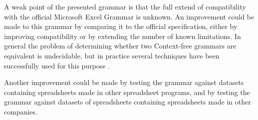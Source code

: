 \documentclass[conference]{IEEEtran}
\begin{document}
A weak point of the presented grammar is that the full extend of compatibility with the official Microsoft Excel Grammar is unknown.
An improvement could be made to this grammar by comparing it to the official specification, either by improving compatibility or by extending the number of known limitations.
In general the problem of determining whether two Context-free grammars are equivalent is undecidable, but in practice several techniques have been successfully used for this purpose \cite{lammel2009introduction,fischer2012comparison}.

Another improvement could be made by testing the grammar against datasets containing spreadsheets made in other spreadsheet programs, and by testing the grammar against datasets of spreadsheets containing spreadsheets made in other companies.




\end{document}
